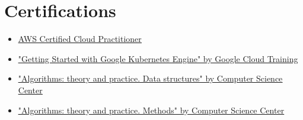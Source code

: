 \documentclass[a4paper,11pt]{article}
\makeatletter
\newcommand{\resumeItem}[1]{
  \item\small{#1}
}
\newcommand{\resumeItemListStart}{\begin{itemize}[rightmargin=0.11in]}
\newcommand{\resumeItemListEnd}{\end{itemize}}
\newcommand{\resumeTrioHeading}[3]{
  \item\small{
    \begin{tabular*}{0.96\textwidth}[t]{
      l@{\extracolsep{\fill}}c@{\extracolsep{\fill}}r
    }
      \textbf{#1} & \textit{#2} & #3
    \end{tabular*}
  }
}
\newcommand{\resumeHeadingListStart}{
  \begin{itemize}[leftmargin=0.15in, label={}]
}
\newcommand{\resumeHeadingListEnd}{\end{itemize}}
\makeatother
\begin{document}





\section{Certifications}
  \resumeItemListStart{}
    \resumeItem{\href{https://www.credly.com/badges/968bad65-6464-49fb-b836-c53a0dd30daf/linked_in_profile}{\uline{AWS Certified Cloud Practitioner}}}
    \resumeItem{\href{https://coursera.org/verify/ND55XKAHNRU4}{\uline{"Getting Started with Google Kubernetes Engine" by Google Cloud Training}}}
    \resumeItem{\href{https://stepik.org/cert/151752?lang=en}{\uline{"Algorithms: theory and practice. Data structures" by Computer Science Center}}}
    \resumeItem{\href{https://stepik.org/cert/39100?lang=en}{\uline{"Algorithms: theory and practice. Methods" by Computer Science Center}}}
  \resumeItemListEnd{}
\end{document}
